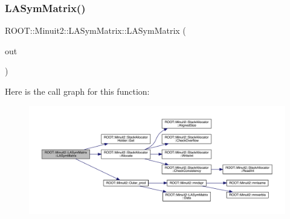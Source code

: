 \subsubsection{\texorpdfstring{LASymMatrix()}{LASymMatrix()}\hspace{0.1cm}{\footnotesize\ttfamily [9/20]}}
{\footnotesize\ttfamily R\+O\+O\+T\+::\+Minuit2\+::\+L\+A\+Sym\+Matrix\+::\+L\+A\+Sym\+Matrix (\begin{DoxyParamCaption}\item[{const \mbox{\hyperlink{classROOT_1_1Minuit2_1_1ABObj}{A\+B\+Obj}}$<$ \mbox{\hyperlink{classROOT_1_1Minuit2_1_1sym}{sym}}, \mbox{\hyperlink{classROOT_1_1Minuit2_1_1VectorOuterProduct}{Vector\+Outer\+Product}}$<$ \mbox{\hyperlink{classROOT_1_1Minuit2_1_1ABObj}{A\+B\+Obj}}$<$ \mbox{\hyperlink{classROOT_1_1Minuit2_1_1vec}{vec}}, \mbox{\hyperlink{classROOT_1_1Minuit2_1_1LAVector}{L\+A\+Vector}}, double $>$, double $>$, double $>$ \&}]{out }\end{DoxyParamCaption})}

Here is the call graph for this function\+:\nopagebreak
\begin{figure}[H]
\begin{center}
\leavevmode
\includegraphics[width=350pt]{d3/d72/classROOT_1_1Minuit2_1_1LASymMatrix_ab3813da18be7a37100a8f9c7cd49caf3_cgraph}
\end{center}
\end{figure}
\mbox{\label{classROOT_1_1Minuit2_1_1LASymMatrix_aed0e1071ce94c05d4b18e7594db9a249}} 
